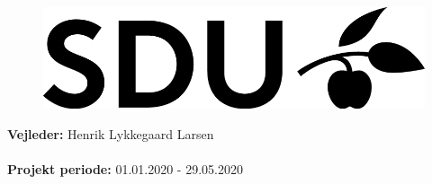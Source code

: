 \begin{titlepage}
\begin{center}
\vfill
\begin{figure}[H]
\centering
\includegraphics[scale=0.8]{figures/SDU_BLACK_RGB.png}
\end{figure}
\vfill


\textbf{Vejleder:} Henrik Lykkegaard Larsen \\ \mbox{}\\
\textbf{Projekt periode:} 01.01.2020 - 29.05.2020
\end{center}
\end{titlepage}

